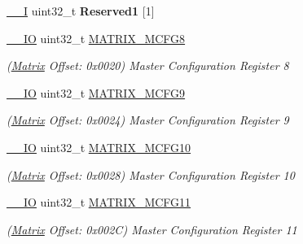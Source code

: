\begin{DoxyCompactItemize}
\mbox{\hyperlink{core__cm7_8h_af63697ed9952cc71e1225efe205f6cd3}{\+\_\+\+\_\+I}} uint32\+\_\+t {\bfseries Reserved1} \mbox{[}1\mbox{]}
\item 
\mbox{\label{structMatrix_a85ef69c6b6ce763f8f2b63fb5725afad}} 
\mbox{\hyperlink{core__cm7_8h_aec43007d9998a0a0e01faede4133d6be}{\+\_\+\+\_\+\+IO}} uint32\+\_\+t \mbox{\hyperlink{structMatrix_a85ef69c6b6ce763f8f2b63fb5725afad}{M\+A\+T\+R\+I\+X\+\_\+\+M\+C\+F\+G8}}
\begin{DoxyCompactList}\small\item\em (\mbox{\hyperlink{structMatrix}{Matrix}} Offset\+: 0x0020) Master Configuration Register 8 \end{DoxyCompactList}\item 
\mbox{\label{structMatrix_a3fcfebb9ef725739907f60429bdc32b6}} 
\mbox{\hyperlink{core__cm7_8h_aec43007d9998a0a0e01faede4133d6be}{\+\_\+\+\_\+\+IO}} uint32\+\_\+t \mbox{\hyperlink{structMatrix_a3fcfebb9ef725739907f60429bdc32b6}{M\+A\+T\+R\+I\+X\+\_\+\+M\+C\+F\+G9}}
\begin{DoxyCompactList}\small\item\em (\mbox{\hyperlink{structMatrix}{Matrix}} Offset\+: 0x0024) Master Configuration Register 9 \end{DoxyCompactList}\item 
\mbox{\label{structMatrix_af4e38400975c15e8aed72066318e9f5d}} 
\mbox{\hyperlink{core__cm7_8h_aec43007d9998a0a0e01faede4133d6be}{\+\_\+\+\_\+\+IO}} uint32\+\_\+t \mbox{\hyperlink{structMatrix_af4e38400975c15e8aed72066318e9f5d}{M\+A\+T\+R\+I\+X\+\_\+\+M\+C\+F\+G10}}
\begin{DoxyCompactList}\small\item\em (\mbox{\hyperlink{structMatrix}{Matrix}} Offset\+: 0x0028) Master Configuration Register 10 \end{DoxyCompactList}\item 
\mbox{\label{structMatrix_afa59463e5a830c6ea5a9d1fe75a06f86}} 
\mbox{\hyperlink{core__cm7_8h_aec43007d9998a0a0e01faede4133d6be}{\+\_\+\+\_\+\+IO}} uint32\+\_\+t \mbox{\hyperlink{structMatrix_afa59463e5a830c6ea5a9d1fe75a06f86}{M\+A\+T\+R\+I\+X\+\_\+\+M\+C\+F\+G11}}
\begin{DoxyCompactList}\small\item\em (\mbox{\hyperlink{structMatrix}{Matrix}} Offset\+: 0x002C) Master Configuration Register 11 \end{DoxyCompactList}\item 

\end{DoxyCompactItemize}
